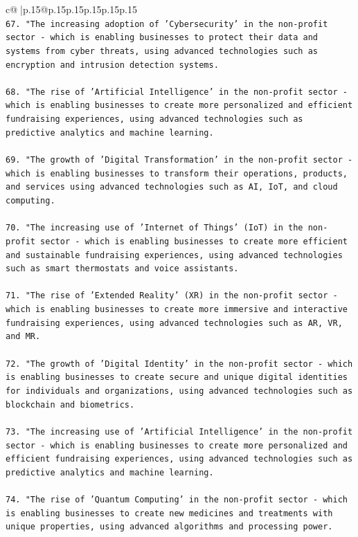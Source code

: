 \documentclass{article}
\begin{document}
{\begin{supertabular}{c@{$\;$}|p{.15\linewidth}@{}p{.15\linewidth}p{.15\linewidth}p{.15\linewidth}p{.15\linewidth}p{.15\linewidth}}
{{{\\ 
\texttt{67. "The increasing adoption of 'Cybersecurity' in the non{-}profit sector {-} which is enabling businesses to protect their data and systems from cyber threats, using advanced technologies such as encryption and intrusion detection systems.} \\
\\ 
\texttt{68. "The rise of 'Artificial Intelligence' in the non{-}profit sector {-} which is enabling businesses to create more personalized and efficient fundraising experiences, using advanced technologies such as predictive analytics and machine learning.} \\
\\ 
\texttt{69. "The growth of 'Digital Transformation' in the non{-}profit sector {-} which is enabling businesses to transform their operations, products, and services using advanced technologies such as AI, IoT, and cloud computing.} \\
\\ 
\texttt{70. "The increasing use of 'Internet of Things' (IoT) in the non{-}profit sector {-} which is enabling businesses to create more efficient and sustainable fundraising experiences, using advanced technologies such as smart thermostats and voice assistants.} \\
\\ 
\texttt{71. "The rise of 'Extended Reality' (XR) in the non{-}profit sector {-} which is enabling businesses to create more immersive and interactive fundraising experiences, using advanced technologies such as AR, VR, and MR.} \\
\\ 
\texttt{72. "The growth of 'Digital Identity' in the non{-}profit sector {-} which is enabling businesses to create secure and unique digital identities for individuals and organizations, using advanced technologies such as blockchain and biometrics.} \\
\\ 
\texttt{73. "The increasing use of 'Artificial Intelligence' in the non{-}profit sector {-} which is enabling businesses to create more personalized and efficient fundraising experiences, using advanced technologies such as predictive analytics and machine learning.} \\
\\ 
\texttt{74. "The rise of 'Quantum Computing' in the non{-}profit sector {-} which is enabling businesses to create new medicines and treatments with unique properties, using advanced algorithms and processing power.} \\
}}}
\end{supertabular}}
\end{document}
